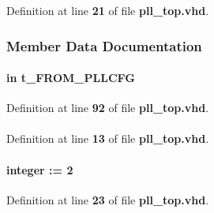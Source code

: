 Definition at line {\bf 21} of file {\bf pll\+\_\+top.\+vhd}.



\subsubsection{Member Data Documentation}
\paragraph[{from\+\_\+pllcfg}]{ {\bfseries \textcolor{keywordflow}{in}\textcolor{vhdlchar}{ }} {\bfseries {\bfseries {\bf t\+\_\+\+F\+R\+O\+M\+\_\+\+P\+L\+L\+C\+FG}} \textcolor{vhdlchar}{ }} \hspace{0.3cm}{\ttfamily [Port]}}\label{classpll__top_a517e6f778d08d8d5396e8aa76d5b1c36}


Definition at line {\bf 92} of file {\bf pll\+\_\+top.\+vhd}.

\paragraph[{ieee}]{\hspace{0.3cm}{\ttfamily [Library]}}\label{classpll__top_a0a6af6eef40212dbaf130d57ce711256}


Definition at line {\bf 13} of file {\bf pll\+\_\+top.\+vhd}.

\paragraph[{N\+\_\+\+P\+LL}]{ {\bfseries \textcolor{vhdlchar}{ }} {\bfseries \textcolor{comment}{integer}\textcolor{vhdlchar}{ }\textcolor{vhdlchar}{ }\textcolor{vhdlchar}{\+:}\textcolor{vhdlchar}{=}\textcolor{vhdlchar}{ }\textcolor{vhdlchar}{ } \textcolor{vhdldigit}{2} \textcolor{vhdlchar}{ }} \hspace{0.3cm}{\ttfamily [Generic]}}\label{classpll__top_ae44a5b8658d932f6b7c6260758512cf5}


Definition at line {\bf 23} of file {\bf pll\+\_\+top.\+vhd}.

